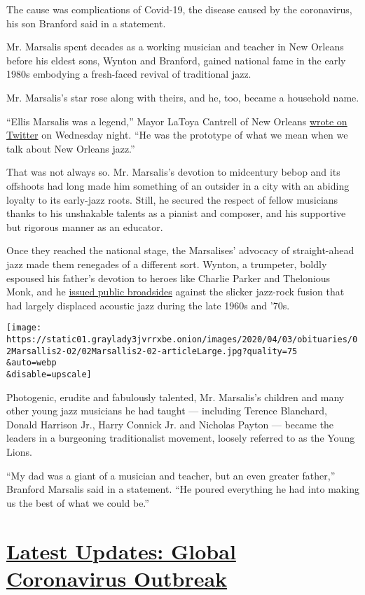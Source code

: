 The cause was complications of Covid-19, the disease caused by the
coronavirus, his son Branford said in a statement.

Mr. Marsalis spent decades as a working musician and teacher in New
Orleans before his eldest sons, Wynton and Branford, gained national
fame in the early 1980s embodying a fresh-faced revival of traditional
jazz.

Mr. Marsalis's star rose along with theirs, and he, too, became a
household name.

``Ellis Marsalis was a legend,'' Mayor LaToya Cantrell of New Orleans
\href{https://twitter.com/mayorcantrell/status/1245523886810238979}{wrote
on Twitter} on Wednesday night. ``He was the prototype of what we mean
when we talk about New Orleans jazz.''

That was not always so. Mr. Marsalis's devotion to midcentury bebop and
its offshoots had long made him something of an outsider in a city with
an abiding loyalty to its early-jazz roots. Still, he secured the
respect of fellow musicians thanks to his unshakable talents as a
pianist and composer, and his supportive but rigorous manner as an
educator.

Once they reached the national stage, the Marsalises' advocacy of
straight-ahead jazz made them renegades of a different sort. Wynton, a
trumpeter, boldly espoused his father's devotion to heroes like Charlie
Parker and Thelonious Monk, and he
\href{https://www.nytimes3xbfgragh.onion/1988/07/31/arts/music-what-jazz-is-and-isn-t.html}{issued
public broadsides} against the slicker jazz-rock fusion that had largely
displaced acoustic jazz during the late 1960s and '70s.

\texttt{[image: https://static01.graylady3jvrrxbe.onion/images/2020/04/03/obituaries/02Marsallis2-02/02Marsallis2-02-articleLarge.jpg?quality=75\\\&auto=webp\\\&disable=upscale]}

Photogenic, erudite and fabulously talented, Mr. Marsalis's children and
many other young jazz musicians he had taught --- including Terence
Blanchard, Donald Harrison Jr., Harry Connick Jr. and Nicholas Payton
--- became the leaders in a burgeoning traditionalist movement, loosely
referred to as the Young Lions.

``My dad was a giant of a musician and teacher, but an even greater
father,'' Branford Marsalis said in a statement. ``He poured everything
he had into making us the best of what we could be.''

\hypertarget{latest-updates-global-coronavirus-outbreak}{%
\section{\texorpdfstring{\href{https://www.nytimes3xbfgragh.onion/2020/08/04/world/coronavirus-covid-19.html?action=click\&pgtype=Article\&state=default\&region=MAIN_CONTENT_1\&context=storylines_live_updates}{Latest
Updates: Global Coronavirus
Outbreak}}{Latest Updates: Global Coronavirus Outbreak}}\label{latest-updates-global-coronavirus-outbreak}}

